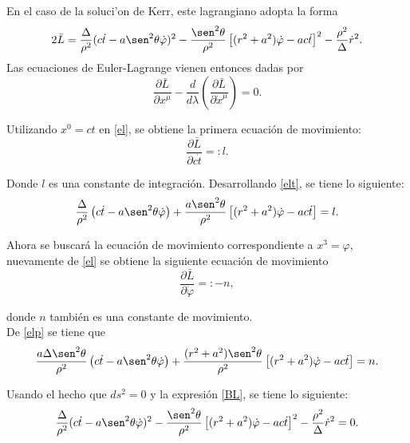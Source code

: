 En el caso de la soluci'on de Kerr, este lagrangiano adopta la forma
\begin{equation}\label{lagrangeano1}
2\bar{L}=\frac{\Delta}{\rho^2}(c\dot{t}-a\sen^2\theta \dot{\varphi})^2-\frac{\sen^2\theta}{\rho^2}\left[(r^2+a^2)\dot{\varphi}-ac\dot{t} \right]^2-\frac{\rho^2}{\Delta}\dot{r}^2.
\end{equation}
Las ecuaciones de Euler-Lagrange vienen entonces dadas por
\begin{equation}\label{el}
\frac{\partial \bar{L}}{\partial x^{\mu}}-\frac{d}{d\lambda}\left(\frac{\partial \bar{L}}{\partial \dot{x}^{\mu}} \right)=0.
\end{equation}

Utilizando $x^0=ct$ en \eqref{el}, se obtiene la primera ecuaci\'on de movimiento:
\begin{equation}\label{elt}
\frac{\partial\bar{L}}{\partial c\dot{t}}=:l.
\end{equation}
 
Donde $l$ es una constante de integraci\'on. Desarrollando \eqref{elt}, se tiene lo siguiente:
\begin{equation}\label{11}
\frac{\Delta}{\rho^2}\left(c\dot{t}-a\sen^2 \theta \dot{\varphi}\right)+\frac{a\sen^2 \theta}{\rho^2}\left[(r^2+a^2)\dot{\varphi}-ac\dot{t} \right]=l.
\end{equation} 
 
 Ahora se buscar\'a la ecuaci\'on de movimiento correspondiente a $x^3=\varphi$, nuevamente de \eqref{el} se obtiene la siguiente ecuaci\'on de movimiento
 \begin{equation}\label{elp}
 \frac{\partial\bar{L}}{\partial \dot{\varphi}}=: -n,
 \end{equation}
 
donde $n$ tambi\'en es una constante de movimiento.\\

De \eqref{elp} se tiene que
\begin{equation}\label{22}
\frac{a\Delta \sen^2 \theta}{\rho^2}\left(c\dot{t}-a\sen^2 \theta \dot{\varphi}\right)+\frac{(r^2+a^2)\sen^2 \theta}{\rho^2}\left[(r^2+a^2)\dot{\varphi}-ac\dot{t} \right]=n.
\end{equation}
 
Usando el hecho que $ds^2=0$ y la expresi\'on \eqref{BL}, se tiene lo siguiente:
\begin{equation}\label{33}
\frac{\Delta}{\rho^2}(c\dot{t}-a\sen^2\theta \dot{\varphi})^2-\frac{\sen^2\theta}{\rho^2}\left[(r^2+a^2)\dot{\varphi}-ac\dot{t} \right]^2-\frac{\rho^2}{\Delta}\dot{r}^2=0.
\end{equation} 
 
